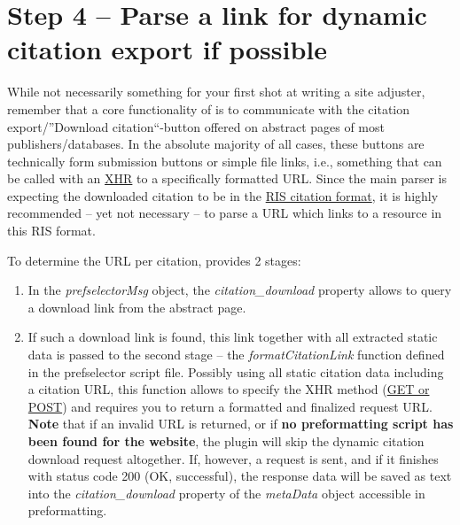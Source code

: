 \documentclass[
a4paper,
12pt,
]
{article}
\begin{document}
\section{Step 4 -- Parse a link for dynamic citation export if possible}\label{sec_4}

While not necessarily something for your first shot at writing a site adjuster, remember that a core functionality of {\plgname} is to communicate with the citation export/''Download citation``-button offered on abstract pages of most publishers/databases. In the absolute majority of all cases, these buttons are technically form submission buttons or simple file links, i.e., something that can be called with an \href{https://developer.mozilla.org/en-US/docs/Web/API/XMLHttpRequest}{XHR} to a specifically formatted URL.
Since the main parser is expecting the downloaded citation to be in the \href{https://en.wikipedia.org/wiki/RIS_(file_format)}{RIS citation format}, it is highly recommended -- yet not necessary -- to parse a URL which links to a resource in this RIS format.\par

To determine the URL per citation, {\plgname} provides 2 stages:
\begin{enumerate}
 \item In the \textit{prefselectorMsg} object, the \textit{citation\_download} property allows to query a download link from the abstract page.
 \item If such a download link is found, this link together with all extracted static data is passed to the second stage -- the \textit{formatCitationLink} function defined in the prefselector script file. Possibly using all static citation data including a citation URL, this function allows to specify the XHR method (\href{https://en.wikipedia.org/wiki/XMLHttpRequest#The_open_method}{GET or POST}) and requires you to return a formatted and finalized  request URL. \textbf{Note} that if an invalid URL is returned, or if \textbf{no preformatting script has been found for the website}, the plugin will skip the dynamic citation download request altogether.
 If, however, a request is sent, and if it finishes with status code 200 (OK, successful), the response data will be saved as text into the \textit{citation\_download} property of the \textit{metaData} object accessible in preformatting. 
\end{enumerate}
\end{document}

